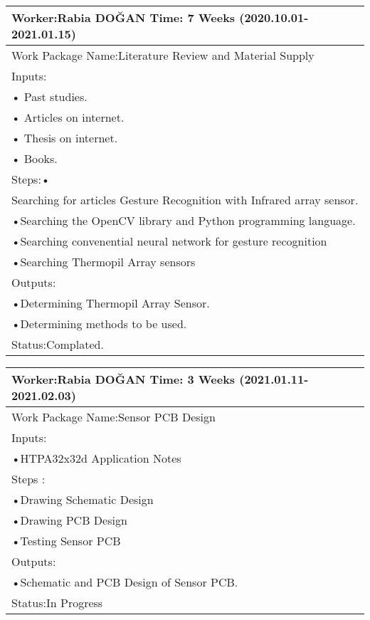 	\begin{table}[h!]
		\begin{adjustbox}{width=\textwidth}
			\begin{tabular}{|l|}\hline
				Worker:Rabia DOĞAN   \tab[8cm] Time: 7 Weeks (2020.10.01-2021.01.15)\\\hline
				Work Package Name:Literature Review and Material Supply\\\hline
				Inputs:\\
				• Past studies.\\
				• Articles on internet.\\
				• Thesis on internet.\\
				• Books.\\\hline	
				Steps:•\\ Searching for articles Gesture Recognition with Infrared array sensor. \\
				•Searching the OpenCV library and Python programming language.\\
				•Searching convenential neural network for gesture recognition \\
				•Searching Thermopil Array sensors\\\hline
				Outputs:\\
				•Determining Thermopil Array Sensor.\\ 
				•Determining methods to be used.\\\hline
				Status:Complated.\\\hline
			\end{tabular}
		\end{adjustbox}
	\end{table}
	\FloatBarrier
	\begin{table}[h!]
		\begin{adjustbox}{width=\textwidth}
			\begin{tabular}{|l|}\hline
				Worker:Rabia DOĞAN   \tab[8cm] Time: 3 Weeks (2021.01.11-2021.02.03)\\\hline
				Work Package Name:Sensor PCB Design\\\hline
				Inputs:\\
				•HTPA32x32d Application Notes \\\hline	
				Steps :\\
				•Drawing Schematic Design\\
				•Drawing PCB Design\\
				•Testing Sensor PCB\\\hline
				Outputs:\\
				•Schematic and PCB Design of Sensor PCB.\\\hline
				Status:In Progress\\\hline
			\end{tabular}
		\end{adjustbox}
	\end{table}
